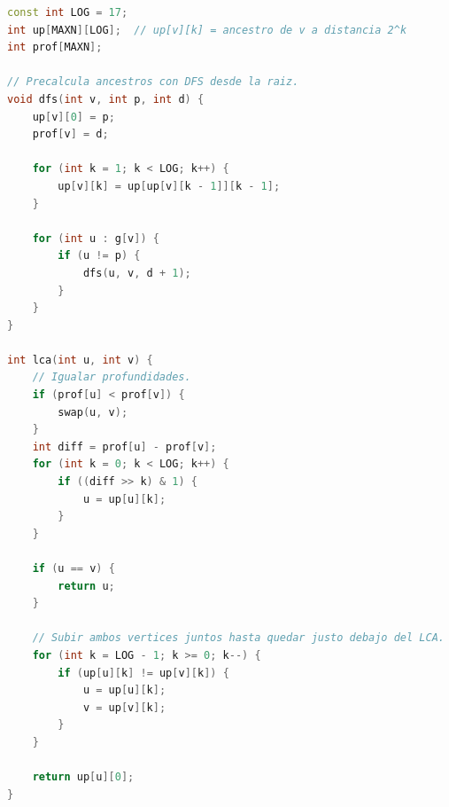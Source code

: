 \begin{lstlisting}[language=C++]
const int LOG = 17;
int up[MAXN][LOG];  // up[v][k] = ancestro de v a distancia 2^k
int prof[MAXN];

// Precalcula ancestros con DFS desde la raiz.
void dfs(int v, int p, int d) {
    up[v][0] = p;
    prof[v] = d;

    for (int k = 1; k < LOG; k++) {
        up[v][k] = up[up[v][k - 1]][k - 1];
    }

    for (int u : g[v]) {
        if (u != p) {
            dfs(u, v, d + 1);
        }
    }
}

int lca(int u, int v) {
    // Igualar profundidades.
    if (prof[u] < prof[v]) {
        swap(u, v);
    }
    int diff = prof[u] - prof[v];
    for (int k = 0; k < LOG; k++) {
        if ((diff >> k) & 1) {
            u = up[u][k];
        }
    }

    if (u == v) {
        return u;
    }

    // Subir ambos vertices juntos hasta quedar justo debajo del LCA.
    for (int k = LOG - 1; k >= 0; k--) {
        if (up[u][k] != up[v][k]) {
            u = up[u][k];
            v = up[v][k];
        }
    }

    return up[u][0];
}
\end{lstlisting}

